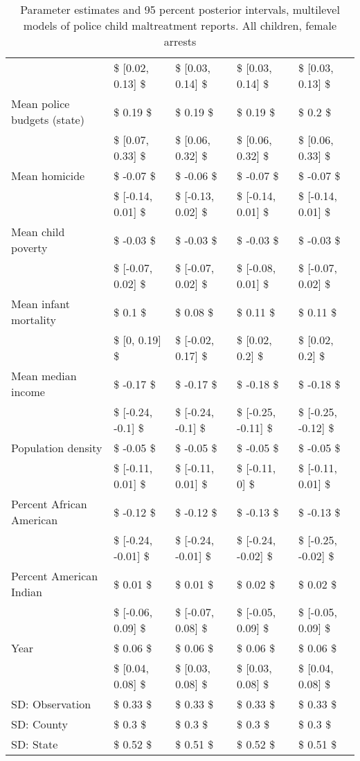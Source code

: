 \begin{table}[ht]
\begin{tabular}{lllll}
   & \$ [0.02, 0.13] \$ & \$ [0.03, 0.14] \$ & \$ [0.03, 0.14] \$ & \$ [0.03, 0.13] \$ \\ 
  Mean police budgets (state) & \$ 0.19 \$ & \$ 0.19 \$ & \$ 0.19 \$ & \$ 0.2 \$ \\ 
   & \$ [0.07, 0.33] \$ & \$ [0.06, 0.32] \$ & \$ [0.06, 0.32] \$ & \$ [0.06, 0.33] \$ \\ 
  Mean homicide & \$ -0.07 \$ & \$ -0.06 \$ & \$ -0.07 \$ & \$ -0.07 \$ \\ 
   & \$ [-0.14, 0.01] \$ & \$ [-0.13, 0.02] \$ & \$ [-0.14, 0.01] \$ & \$ [-0.14, 0.01] \$ \\ 
  Mean child poverty & \$ -0.03 \$ & \$ -0.03 \$ & \$ -0.03 \$ & \$ -0.03 \$ \\ 
   & \$ [-0.07, 0.02] \$ & \$ [-0.07, 0.02] \$ & \$ [-0.08, 0.01] \$ & \$ [-0.07, 0.02] \$ \\ 
  Mean infant mortality & \$ 0.1 \$ & \$ 0.08 \$ & \$ 0.11 \$ & \$ 0.11 \$ \\ 
   & \$ [0, 0.19] \$ & \$ [-0.02, 0.17] \$ & \$ [0.02, 0.2] \$ & \$ [0.02, 0.2] \$ \\ 
  Mean median income & \$ -0.17 \$ & \$ -0.17 \$ & \$ -0.18 \$ & \$ -0.18 \$ \\ 
   & \$ [-0.24, -0.1] \$ & \$ [-0.24, -0.1] \$ & \$ [-0.25, -0.11] \$ & \$ [-0.25, -0.12] \$ \\ 
  Population density & \$ -0.05 \$ & \$ -0.05 \$ & \$ -0.05 \$ & \$ -0.05 \$ \\ 
   & \$ [-0.11, 0.01] \$ & \$ [-0.11, 0.01] \$ & \$ [-0.11, 0] \$ & \$ [-0.11, 0.01] \$ \\ 
  Percent African American & \$ -0.12 \$ & \$ -0.12 \$ & \$ -0.13 \$ & \$ -0.13 \$ \\ 
   & \$ [-0.24, -0.01] \$ & \$ [-0.24, -0.01] \$ & \$ [-0.24, -0.02] \$ & \$ [-0.25, -0.02] \$ \\ 
  Percent American Indian & \$ 0.01 \$ & \$ 0.01 \$ & \$ 0.02 \$ & \$ 0.02 \$ \\ 
   & \$ [-0.06, 0.09] \$ & \$ [-0.07, 0.08] \$ & \$ [-0.05, 0.09] \$ & \$ [-0.05, 0.09] \$ \\ 
  Year & \$ 0.06 \$ & \$ 0.06 \$ & \$ 0.06 \$ & \$ 0.06 \$ \\ 
   & \$ [0.04, 0.08] \$ & \$ [0.03, 0.08] \$ & \$ [0.03, 0.08] \$ & \$ [0.04, 0.08] \$ \\ 
  SD: Observation & \$ 0.33 \$ & \$ 0.33 \$ & \$ 0.33 \$ & \$ 0.33 \$ \\ 
  SD: County & \$ 0.3 \$ & \$ 0.3 \$ & \$ 0.3 \$ & \$ 0.3 \$ \\ 
  SD: State & \$ 0.52 \$ & \$ 0.51 \$ & \$ 0.52 \$ & \$ 0.51 \$ \\ 
   \hline
\end{tabular}
\caption{Parameter estimates and 95 percent posterior intervals, multilevel models of 
             police child maltreatment reports. All children, female arrests} 
\end{table}
